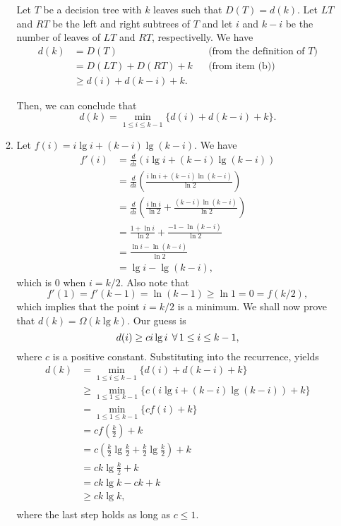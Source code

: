 \begin{enumerate}
\begin{framed}
\begin{enumerate}
{Let $T$ be a decision tree with $k$ leaves such that $D(T) = d(k)$. Let $LT$ and
$RT$ be the left and right subtrees of $T$ and let $i$ and $k - i$ be the number
of leaves of $LT$ and $RT$, respectivelly. We have
\begin{equation*}
\begin{aligned}
  d(k) &=   D(T) && \text{(from the definition of $T$)}\\
       &=   D(LT) + D(RT) + k && \text{(from item (b))}\\
       &\ge d(i) + d(k - i) + k.
\end{aligned}
\end{equation*}

Then, we can conclude that
\[
  d(k) = \min_{1 \le i \le k - 1} \{d(i) + d(k - i) + k\}.
\]
}

\newpage

\item{
Let $f(i) = i \lg i + (k - i) \lg (k - i)$. We have
\begin{equation*}
\begin{aligned}
  f'(i) &= \frac{d}{di} \left( i \lg i + (k - i) \lg (k - i) \right)\\
        &= \frac{d}{di} \left( \frac{i \ln i + (k - i) \ln (k - i)}{\ln 2} \right)\\
        &= \frac{d}{di} \left( \frac{i \ln i}{\ln 2} + \frac{(k - i) \ln (k - i)}{\ln 2} \right)\\
        &= \frac{1 + \ln i}{\ln 2} + \frac{- 1 - \ln (k - i)}{\ln 2}\\
        &= \frac{\ln i - \ln (k - i)}{\ln 2}\\
        &= \lg i - \lg (k - i),
\end{aligned}
\end{equation*}
which is 0 when $i = k/2$. Also note that
\[
  f'(1) = f'(k - 1) = \ln(k - 1) \ge \ln 1 = 0 = f(k/2),
\]
which implies that the point $i = k/2$ is a minimum. We shall now prove that
$d(k) = \Omega(k \lg k)$. Our guess is
\[
  d(i) \ge c i \lg i \; \operatorname{\forall} 1 \le i \le k - 1,
\]
where $c$ is a positive constant. Substituting into the recurrence, yields
\begin{equation*}
\begin{aligned}
  d(k) &=   \min_{1 \le i \le k - 1} \{d(i) + d(k - i) + k\}\\
       &\ge \min_{1 \le 1 \le k - 1} \{c (i \lg i + (k - i) \lg (k - i)) + k\}\\
       &=   \min_{1 \le 1 \le k - 1} \{c f(i) + k\}\\
       &=   c f\left(\frac{k}{2}\right) + k\\
       &=   c \left(\frac{k}{2} \lg \frac{k}{2} + \frac{k}{2} \lg \frac{k}{2}\right) + k\\
       &=   c k \lg \frac{k}{2} + k\\
       &=   c k \lg k - c k + k\\
       &\ge c k \lg k,\\
\end{aligned}
\end{equation*}
where the last step holds as long as $c \le 1$.
}


\end{enumerate}
\end{framed}
\end{enumerate}
